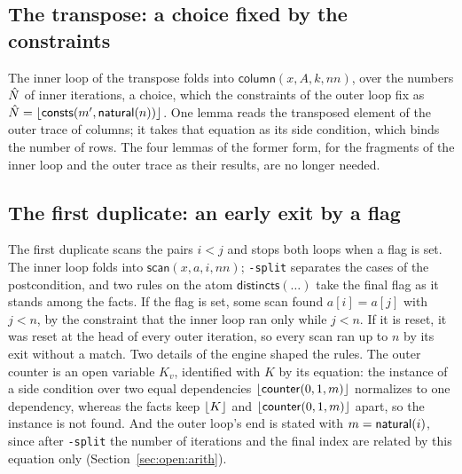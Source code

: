\subsection{The transpose: a choice fixed by the constraints}\label{sec:open:transpose}
The inner loop of the transpose folds into $\mathsf{column}(x, A, k, nn)$, over the numbers $\hat{N}$ of inner
iterations, a choice, which the constraints of the outer loop fix as $\hat{N} = \lfloor \mathsf{consts}(m', \mathsf{natural}(n))\rfloor$. One lemma
reads the transposed element of the outer trace of columns; it takes that equation as its side condition, which binds
the number of rows. The four lemmas of the former form, for the fragments of the inner loop and the outer trace as their
results, are no longer needed.

\subsection{The first duplicate: an early exit by a flag}\label{sec:open:flags}
The first duplicate scans the pairs $i < j$ and stops both loops when a flag is set. The inner loop folds into
$\mathsf{scan}(x, a, i, nn)$; \texttt{-split} separates the cases of the postcondition, and two rules on the atom
$\mathsf{distincts}(\ldots)$ take the final flag as it stands among the facts. If the flag is set, some scan found
$a[i] = a[j]$ with $j < n$, by the constraint that the inner loop ran only while $j < n$. If it is reset, it was reset
at the head of every outer iteration, so every scan ran up to $n$ by its exit without a match. Two details of the
engine shaped the rules. The outer counter is an open variable $K_v$, identified with $K$ by its equation: the instance
of a side condition over two equal dependencies $\lfloor \mathsf{counter}(0, 1, m)\rfloor$ normalizes to one dependency, whereas the facts
keep $\lfloor K\rfloor$ and $\lfloor \mathsf{counter}(0, 1, m)\rfloor$ apart, so the instance is not found. And the outer loop's end is stated with
$m = \mathsf{natural}(i)$, since after \texttt{-split} the number of iterations and the final index are related by this equation
only (Section~\ref{sec:open:arith}).

